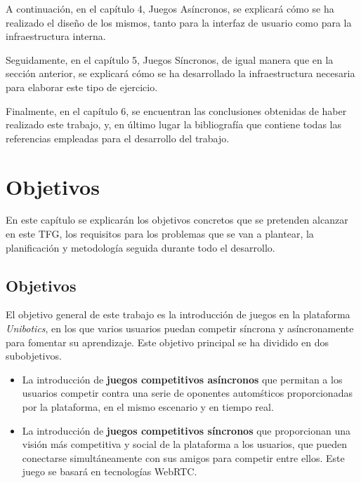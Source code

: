 \documentclass[a4paper, 12pt]{book}
\begin{document}
A continuación, en el capítulo 4, Juegos Asíncronos, se explicará cómo se ha realizado el diseño de los mismos, tanto para la interfaz de usuario como para la infraestructura interna.

Seguidamente, en el capítulo 5, Juegos Síncronos, de igual manera que en la sección anterior, se explicará cómo se ha desarrollado la infraestructura necesaria para elaborar este tipo de ejercicio.

Finalmente, en el capítulo 6, se encuentran las conclusiones obtenidas de haber realizado este trabajo, y, en último lugar la bibliografía que contiene todas las referencias empleadas para el desarrollo del trabajo.


\cleardoublepage %
\chapter{Objetivos} %
\label{chap:objetivos} %

En este capítulo se explicarán los objetivos concretos que se pretenden alcanzar en este TFG, los requisitos para los problemas que se van a plantear, la planificación y metodología seguida durante todo el desarrollo.

\section{Objetivos} %
\label{sec:objetivo-general} %

El objetivo general de este trabajo es la introducción de juegos en la plataforma \emph{Unibotics}, en los que varios usuarios puedan competir síncrona y asíncronamente para fomentar su aprendizaje. Este objetivo principal se ha dividido en dos subobjetivos.

\begin{itemize}
\item La introducción de \textbf{juegos competitivos asíncronos} que permitan a los usuarios competir contra una serie de oponentes automśticos proporcionadas por la plataforma, en el mismo escenario y en tiempo real.
\item La introducción de \textbf{juegos competitivos síncronos} que proporcionan una visión más competitiva y social de la plataforma a los usuarios, que pueden conectarse simultáneamente con sus amigos para competir entre ellos. Este juego se basará en tecnologías WebRTC.
\end{itemize}
\end{document}
